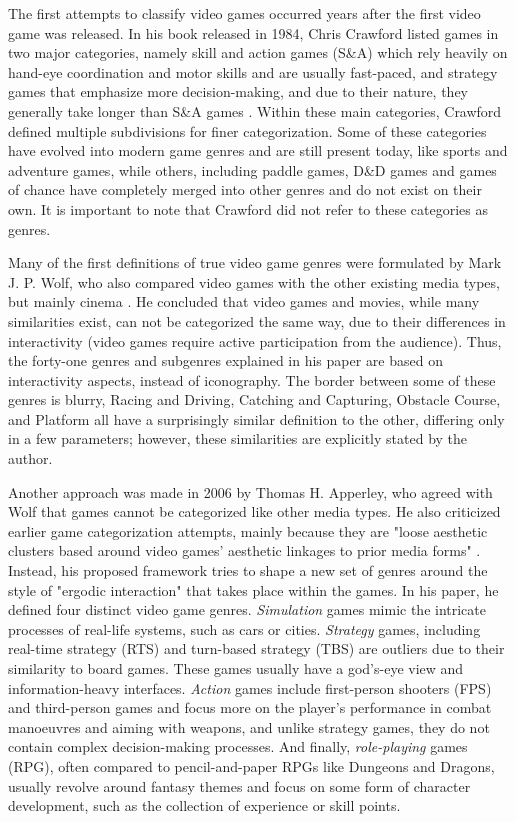 The first attempts to classify video games occurred years after the first video game was released. In his book released in 1984, Chris Crawford listed games in two major categories, namely skill and action games (S\&A) which rely heavily on hand-eye coordination and motor skills and are usually fast-paced, and strategy games that emphasize more decision-making, and due to their nature, they generally take longer than S\&A games \cite{crawford1984art}. Within these main categories, Crawford defined multiple subdivisions for finer categorization. Some of these categories have evolved into modern game genres and are still present today, like sports and adventure games, while others, including paddle games, D\&D games and games of chance have completely merged into other genres and do not exist on their own. It is important to note that Crawford did not refer to these categories as genres.

Many of the first definitions of true video game genres were formulated by Mark J. P. Wolf, who also compared video games with the other existing media types, but mainly cinema \cite{wolf2002genre}. He concluded that video games and movies, while many similarities exist, can not be categorized the same way, due to their differences in interactivity (video games require active participation from the audience). Thus, the forty-one genres and subgenres explained in his paper \cite{wolf2002genre} are based on interactivity aspects, instead of iconography. The border between some of these genres is blurry, Racing and Driving, Catching and Capturing, Obstacle Course, and Platform all have a surprisingly similar definition to the other, differing only in a few parameters; however, these similarities are explicitly stated by the author.

Another approach was made in 2006 by Thomas H. Apperley, who agreed with Wolf that games cannot be categorized like other media types. He also criticized earlier game categorization attempts, mainly because they are "loose aesthetic clusters based around video games' aesthetic linkages to prior media forms" \cite{apperley2006genre}. Instead, his proposed framework tries to shape a new set of genres around the style of "ergodic interaction" that takes place within the games. In his paper, he defined four distinct video game genres. \textit{Simulation} games mimic the intricate processes of real-life systems, such as cars or cities. \textit{Strategy} games, including real-time strategy (RTS) and turn-based strategy (TBS) are outliers due to their similarity to board games. These games usually have a god's-eye view and information-heavy interfaces. \textit{Action} games include first-person shooters (FPS) and third-person games and focus more on the player's performance in combat manoeuvres and aiming with weapons, and unlike strategy games, they do not contain complex decision-making processes. And finally, \textit{role-playing} games (RPG), often compared to pencil-and-paper RPGs like Dungeons and Dragons, usually revolve around fantasy themes and focus on some form of character development, such as the collection of experience or skill points.

